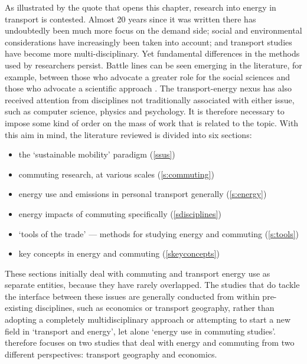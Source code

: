 As illustrated by the quote that opens this chapter,
research into energy in transport is
contested. Almost 20 years since it was written
there has undoubtedly been much more focus on the demand side;
social and environmental considerations have increasingly been
taken into account; and transport studies have become more
multi-disciplinary. Yet fundamental differences in the methods used by
researchers persist. Battle lines can be seen emerging in the literature,
for example, between those
who advocate a greater role for the social sciences \citep{Schwanen2011} and
those who advocate a scientific approach 
\citep{Simini2012, Marshall2008}. The transport-energy nexus has also received
attention from disciplines not traditionally associated with either issue,
such as computer science, physics and psychology.  It is therefore necessary to
impose some kind of order on the mass of work that is related to the topic.
With this aim in mind, the literature reviewed is divided into six sections:
\begin{itemize}
 \item the `sustainable mobility' paradigm (\cref{ssus})
 \item commuting research, at various scales   (\cref{s:commuting})
 \item energy use and emissions in personal transport generally (\cref{s:energy})
 \item energy impacts of commuting specifically (\cref{sdisciplines})
\item `tools of the trade' --- methods for studying energy and commuting
(\cref{s:tools})
\item key concepts in energy and commuting (\cref{skeyconcepts})
\end{itemize}
These sections initially deal with commuting and
transport energy use as separate entities,
because they have rarely overlapped. The studies that
do tackle the interface between these issues are generally conducted from
within pre-existing disciplines, such as economics or transport geography,
rather than adopting a completely multidisciplinary approach or attempting
to start a new field in `transport and energy', let alone
`energy use in commuting studies'.
 therefore focuses on two studies
that deal with energy and commuting from two different perspectives:
transport geography and economics.
